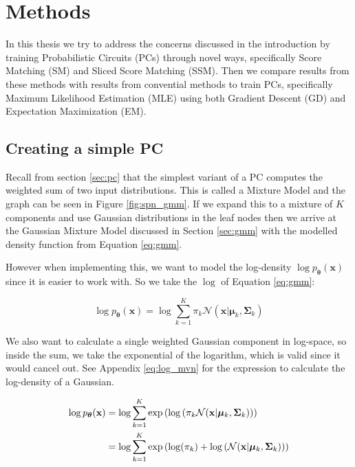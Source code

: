 \renewcommand{\vec}[1]{\textbf{#1}}
\renewcommand{\norm}[1]{\left\lVert#1\right\rVert}

\chapter{Methods}
\label{cha:methods}

In this thesis we try to address the concerns discussed in the introduction by training 
Probabilistic Circuits (PCs) through novel ways, specifically Score Matching (SM) and Sliced Score Matching (SSM).
Then we compare results from these methods with results from convential methods to train PCs, specifically Maximum Likelihood Estimation (MLE) using both Gradient Descent (GD) and Expectation Maximization (EM). \\

\section{Creating a simple PC}
\label{sec:simple_pc}

Recall from section \ref{sec:pc} that the simplest variant of a PC computes the weighted sum of two input distributions. This is 
called a Mixture Model and the graph can be seen in Figure \ref{fig:spn_gmm}. If we expand this to a mixture 
of $K$ components and use Gaussian distributions in the leaf nodes then we arrive at the Gaussian Mixture Model 
discussed in Section \ref{sec:gmm} with the modelled density function from Equation \ref{eq:gmm}.

However when implementing this, we want to model the log-density $\log p_{\boldsymbol{\theta}}(\vec x)$ since it is easier to work with. So 
we take the $\log$ of Equation \ref{eq:gmm}:

\begin{equation}
    \log p_{\boldsymbol{\theta}}(\vec x) = \log \sum_{k=1}^K \pi_k \mathcal{N}(\vec x|\boldsymbol{\mu}_k, \boldsymbol{\Sigma}_k) 
    \label{eq:gmm_log}
\end{equation}

We also want to calculate a single weighted Gaussian component in log-space, so inside the sum, we take 
the exponential of the logarithm, which is valid since it would cancel out. See Appendix \ref{eq:log_mvn} for the expression
to calculate the log-density of a Gaussian. 

\begin{align}
    \log p_{\boldsymbol{\theta}}(\vec x) & = \log \sum_{k=1}^K \exp \left( \log \left(\pi_k \mathcal{N}(\vec x|\boldsymbol{\mu}_k, \boldsymbol{\Sigma}_k) \right) \right) \notag \\
    & = \log \sum_{k=1}^K \exp \left( \log (\pi_k) + \log \left( \mathcal{N}(\vec x|\boldsymbol{\mu}_k, \boldsymbol{\Sigma}_k) \right) \right)
    \label{eq:gmm_log2}
\end{align}

